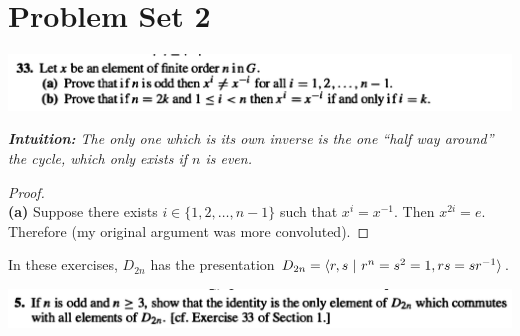 \section*{Problem  Set 2}

\begin{mdframed}
  \includegraphics[width=400pt]{img/algebra--nf--2-d8d7.png}
\end{mdframed}


{\it {\bf Intuition:} The only one which is its own inverse is the one ``half way around​'' the cycle, which only exists if $n$ is even. }


\begin{proof}~\\
  {\bf (a)} Suppose there exists $i \in \{1, 2, \ldots, n - 1\}$ such that $x^i = x^{-1}$.
  Then $x^{2i} = e$. Therefore  (my original argument was more convoluted).

\end{proof}

\begin{mdframed}
In these exercises, $D_{2n}$ has the presentation $D_{2n} = \langle r, s ~|~ r^n = s^2 = 1, rs = sr^{-1} \rangle$.
\end{mdframed}

\begin{mdframed}
\includegraphics[width=400pt]{img/algebra--nf--2-21ce.png}
\end{mdframed}


